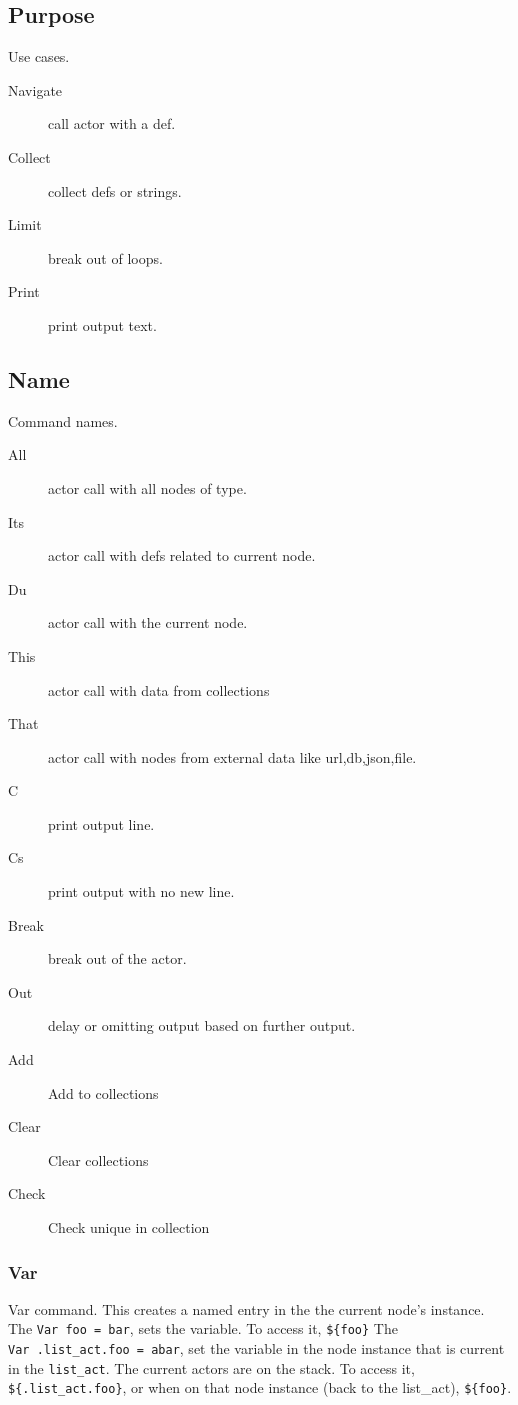 \documentclass[11pt]{article}
\begin{document}
\subsection{Purpose}
Use cases.
\begin{description}
\item[Navigate]  call actor with a def.
\item[Collect]  collect defs or strings.
\item[Limit]  break out of loops.
\item[Print]  print output text.
\end{description}
\subsection{Name}
Command names.
\begin{description}
\item[All]  actor call with all nodes of type.
\item[Its]  actor call with defs related to current node.
\item[Du]  actor call with the current node.
\item[This]  actor call with data from collections
\item[That]  actor call with nodes from external data like url,db,json,file.
\item[C]  print output line.
\item[Cs]  print output with no new line.
\item[Break]  break out of the actor.
\item[Out]  delay or omitting output based on further output.
\item[Add]  Add to collections
\item[Clear]  Clear collections
\item[Check]  Check unique in collection
\end{description}
\subsubsection{Var}
Var command.
This creates a named entry in the the current node's instance. The
\texttt{Var\ foo\ =\ bar}, sets the variable. To access it,
\texttt{\$\{foo\}} The \texttt{Var\ .list\_act.foo\ =\ abar}, set the
variable in the node instance that is current in the \texttt{list\_act}.
The current actors are on the stack. To access it,
\texttt{\$\{.list\_act.foo\}}, or when on that node instance (back to
the list\_act), \texttt{\$\{foo\}}.
\end{document}

